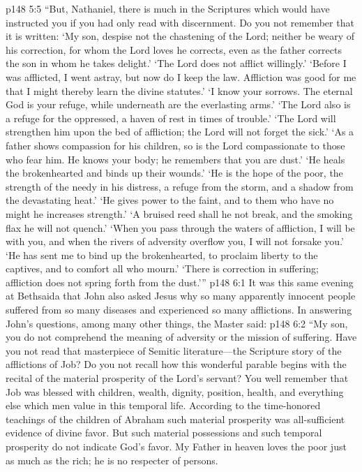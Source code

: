 \vs p148 5:5 \textcolor{ubdarkred}{“But, Nathaniel, there is much in the Scriptures which would have instructed you if you had only read with discernment. Do you not remember that it is written: ‘My son, despise not the chastening of the Lord; neither be weary of his correction, for whom the Lord loves he corrects, even as the father corrects the son in whom he takes delight.’ ‘The Lord does not afflict willingly.’ ‘Before I was afflicted, I went astray, but now do I keep the law. Affliction was good for me that I might thereby learn the divine statutes.’ ‘I know your sorrows. The eternal God is your refuge, while underneath are the everlasting arms.’ ‘The Lord also is a refuge for the oppressed, a haven of rest in times of trouble.’ ‘The Lord will strengthen him upon the bed of affliction; the Lord will not forget the sick.’ ‘As a father shows compassion for his children, so is the Lord compassionate to those who fear him. He knows your body; he remembers that you are dust.’ ‘He heals the brokenhearted and binds up their wounds.’ ‘He is the hope of the poor, the strength of the needy in his distress, a refuge from the storm, and a shadow from the devastating heat.’ ‘He gives power to the faint, and to them who have no might he increases strength.’ ‘A bruised reed shall he not break, and the smoking flax he will not quench.’ ‘When you pass through the waters of affliction, I will be with you, and when the rivers of adversity overflow you, I will not forsake you.’ ‘He has sent me to bind up the brokenhearted, to proclaim liberty to the captives, and to comfort all who mourn.’ ‘There is correction in suffering; affliction does not spring forth from the dust.’”}
\vs p148 6:1 It was this same evening at Bethsaida that John also asked Jesus why so many apparently innocent people suffered from so many diseases and experienced so many afflictions. In answering John’s questions, among many other things, the Master said:
\pc \vs p148 6:2 \textcolor{ubdarkred}{“My son, you do not comprehend the meaning of adversity or the mission of suffering. Have you not read that masterpiece of Semitic literature---the Scripture story of the afflictions of Job? Do you not recall how this wonderful parable begins with the recital of the material prosperity of the Lord’s servant? You well remember that Job was blessed with children, wealth, dignity, position, health, and everything else which men value in this temporal life. According to the time\hyp{}honored teachings of the children of Abraham such material prosperity was all\hyp{}sufficient evidence of divine favor. But such material possessions and such temporal prosperity do not indicate God’s favor. My Father in heaven loves the poor just as much as the rich; he is no respecter of persons.}
